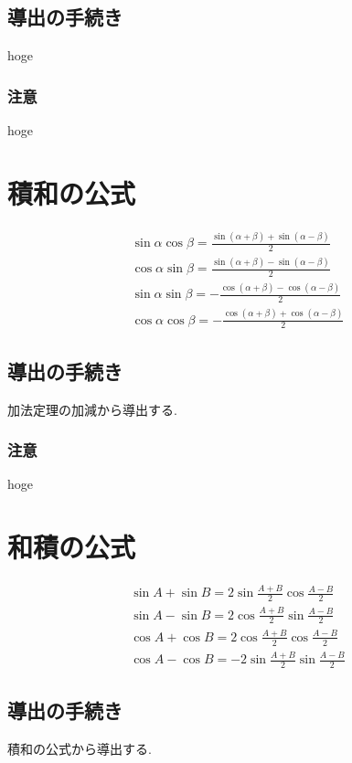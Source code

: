 \documentclass[a4paper, 12pt]{jsreport}
\begin{document}
\subsection{導出の手続き}
hoge
\subsubsection{注意}
hoge

\section{積和の公式}
\begin{equation}
    \begin{array}{l}
        \sin\alpha\cos\beta=\frac{\sin(\alpha+\beta)+\sin(\alpha-\beta)}{2}\\
        \cos\alpha\sin\beta=\frac{\sin(\alpha+\beta)-\sin(\alpha-\beta)}{2}\\
        \sin\alpha\sin\beta=-\frac{\cos(\alpha+\beta)-\cos(\alpha-\beta)}{2}\\
        \cos\alpha\cos\beta=-\frac{\cos(\alpha+\beta)+\cos(\alpha-\beta)}{2}
    \end{array}
\end{equation}
\subsection{導出の手続き}
加法定理の加減から導出する.
\subsubsection{注意}
hoge

\section{和積の公式}
\begin{equation}
    \begin{array}{l}
        \sin A+\sin B=2\sin\frac{A+B}{2}\cos\frac{A-B}{2}\\
        \sin A-\sin B=2\cos\frac{A+B}{2}\sin\frac{A-B}{2}\\
        \cos A+\cos B=2\cos\frac{A+B}{2}\cos\frac{A-B}{2}\\
        \cos A-\cos B=-2\sin\frac{A+B}{2}\sin\frac{A-B}{2}
    \end{array}
\end{equation}
\subsection{導出の手続き}
積和の公式から導出する.
\end{document}
